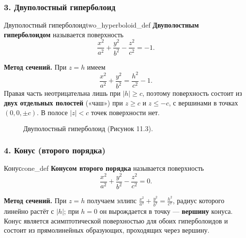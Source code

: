 \documentclass[12pt,a4paper]{article}
\begin{document}
\subsubsection*{3. Двуполостный гиперболоид}

\begin{definition}{Двуполостный гиперболоид}{two_hyperboloid_def}
  \textbf{Двуполостным гиперболоидом} называется поверхность
  \begin{equation}
    \frac{x^2}{a^2} + \frac{y^2}{b^2} - \frac{z^2}{c^2} = -1. \tag{11.6}
  \end{equation}

  \textbf{Метод сечений.} При $z = h$ имеем
  \[
    \frac{x^2}{a^2} + \frac{y^2}{b^2} = \frac{h^2}{c^2} - 1.
  \]
  Правая часть неотрицательна лишь при $|h| \ge c$, поэтому
  поверхность состоит из \textbf{двух отдельных полостей}
  («чаш») при $z \ge c$ и $z \le -c$, с вершинами в точках
  $(0, 0, \pm c)$. В полосе $|z| < c$ точек поверхности нет.
\end{definition}

\begin{figure}[h!]
  \centering
  \caption{Двуполостный гиперболоид (Рисунок 11.3).}
  \label{fig:two_hyperboloid}
\end{figure}

\subsubsection*{4. Конус (второго порядка)}

\begin{definition}{Конус}{cone_def}
  \textbf{Конусом второго порядка} называется поверхность
  \begin{equation}
    \frac{x^2}{a^2} + \frac{y^2}{b^2} - \frac{z^2}{c^2} = 0. \tag{11.7}
  \end{equation}

  \textbf{Метод сечений.} При $z = h$ получаем эллипс
  $\frac{x^2}{a^2} + \frac{y^2}{b^2} = \frac{h^2}{c^2}$, радиус
  которого линейно растёт с $|h|$; при $h = 0$ он вырождается в
  точку — \textbf{вершину} конуса. Конус является асимптотической
  поверхностью для обоих гиперболоидов и состоит из прямолинейных
  образующих, проходящих через вершину.
\end{definition}
\end{document}
